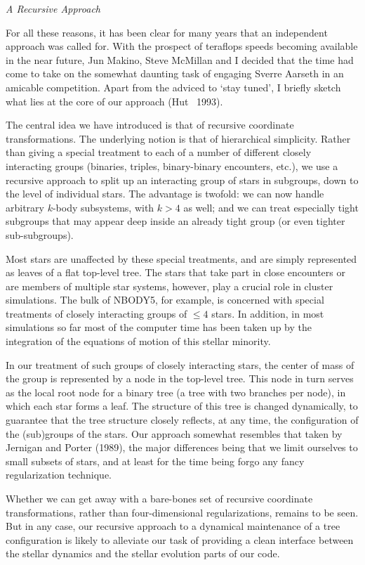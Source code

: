 \bigskip
\noindent
{\it A Recursive Approach}
\medskip

For all these reasons, it has been clear for many years that an
independent approach was called for.  With the prospect of teraflops
speeds becoming available in the near future, Jun Makino, Steve
McMillan and I decided that the time had come to take on the somewhat
daunting task of engaging Sverre Aarseth in an amicable competition.
Apart from the adviced to `stay tuned', I briefly sketch what lies at
the core of our approach (Hut \etal\ 1993).

The central idea we have introduced is that of recursive coordinate
transformations.  The underlying notion is that of hierarchical
simplicity.  Rather than giving a special treatment to each of a
number of different closely interacting groups (binaries, triples,
binary-binary encounters, etc.), we use a recursive approach to split
up an interacting group of stars in subgroups, down to the level of
individual stars.  The advantage is twofold: we can now handle
arbitrary $k$-body subsystems, with $k>4$ as well; and we can treat
especially tight subgroups that may appear deep inside an already
tight group (or even tighter sub-subgroups).

Most stars are unaffected by these special treatments, and are
simply represented as leaves of a flat top-level tree.  The stars
that take part in close encounters or are members of multiple star
systems, however, play a crucial role in cluster simulations.  The
bulk of NBODY5, for example, is concerned with special treatments of
closely interacting groups of $\leq 4$ stars.  In addition, in most
simulations so far most of the computer time has been taken up by the
integration of the equations of motion of this stellar minority.

In our treatment of such groups of closely interacting stars, the
center of mass of the group is represented by a node in the top-level
tree.  This node in turn serves as the local root node for a binary
tree (a tree with two branches per node), in which each star forms a
leaf.  The structure of this tree is changed dynamically, to guarantee
that the tree structure closely reflects, at any time, the
configuration of the (sub)groups of the stars.  Our approach somewhat
resembles that taken by Jernigan and Porter (1989), the major
differences being that we limit ourselves to small subsets of stars,
and at least for the time being forgo any fancy regularization
technique.

Whether we can get away with a bare-bones set of recursive coordinate
transformations, rather than four-dimensional regularizations, remains
to be seen.  But in any case, our recursive approach to a dynamical
maintenance of a tree configuration is likely to alleviate our task of
providing a clean interface between the stellar dynamics and the
stellar evolution parts of our code.

